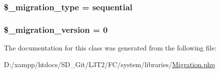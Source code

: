 \subsubsection[{\$\+\_\+migration\+\_\+type}]{\setlength{\rightskip}{0pt plus 5cm}\$\+\_\+migration\+\_\+type = \textquotesingle{}sequential\textquotesingle{}\hspace{0.3cm}{\ttfamily [protected]}}\label{class_c_i___migration_a74ff9f79bd4a13fec8a3f08bc57ead97}
\hypertarget{class_c_i___migration_a6bffbb1001557bd7ffb22183b51f589d}{}
\subsubsection[{\$\+\_\+migration\+\_\+version}]{\setlength{\rightskip}{0pt plus 5cm}\$\+\_\+migration\+\_\+version = 0\hspace{0.3cm}{\ttfamily [protected]}}\label{class_c_i___migration_a6bffbb1001557bd7ffb22183b51f589d}


The documentation for this class was generated from the following file\+:\begin{DoxyCompactItemize}
\item 
D\+:/xampp/htdocs/\+S\+D\+\_\+\+Git/\+L3\+T2/\+F\+C/system/libraries/\hyperlink{system_2libraries_2migration_8php}{Migration.\+php}\end{DoxyCompactItemize}
